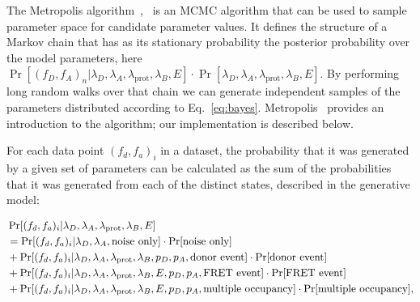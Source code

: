 The Metropolis algorithm~\cite{metropolis53},~\cite{hastings70} is an MCMC algorithm that can be used to sample parameter space for candidate parameter values. It defines the structure of a Markov chain that has as its stationary probability the posterior probability over the model parameters, here $\Pr[(f_D, f_A)_n |\lambda_D, \lambda_A, \lambda_{\text{prot}}, \lambda_B, E] \cdot \Pr[\lambda_D, \lambda_A, \lambda_{\text{prot}}, \lambda_B, E]$. By performing long random walks over that chain we can generate independent samples of the parameters distributed according to Eq.~\ref{eq:bayes}. Metropolis~\cite{chib95} provides an introduction to the algorithm; our implementation is described below.


For each data point $(f_d, f_a)_i$ in a dataset, the probability that it was generated by a given set of parameters can be calculated as the sum of the probabilities that it was generated from each of the distinct states, described in the generative model:

\begin{equation}
\begin{aligned}
\footnotesize
&\Pr[(f_d, f_a)_i|\lambda_D, \lambda_A, \lambda_{\text{prot}}, \lambda_B, E] \\ 
&= \Pr[(f_d, f_a)_i|\lambda_D, \lambda_A, \text{noise only}] \cdot \Pr[\text{noise only}] \\
&+ \Pr[(f_d, f_a)_i|\lambda_D, \lambda_A, \lambda_{\text{prot}}, \lambda_B, p_D, p_A, \text{donor event}] \cdot \Pr[\text{donor event}]\\ 
&+ \Pr[(f_d, f_a)_i|\lambda_D, \lambda_A, \lambda_{\text{prot}}, \lambda_B, E, p_D, p_A, \text{FRET event}] \cdot \Pr[\text{FRET event}] \\
&+ \Pr[(f_d, f_a)_i|\lambda_D, \lambda_A, \lambda_{\text{prot}}, \lambda_B, E, p_D, p_A, \text{multiple occupancy}] \cdot \Pr[\text{multiple occupancy}], \\
\label{eq:multi_sum}
\end{aligned}
\end{equation}


